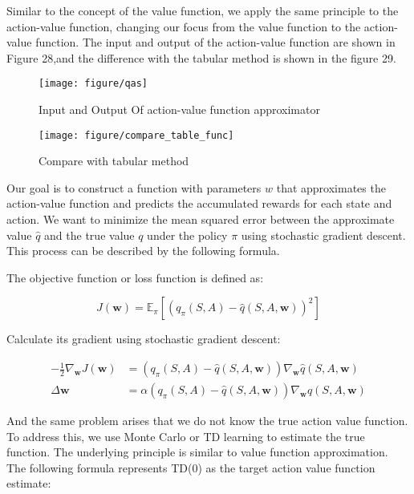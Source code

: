 \documentclass{article}
\begin{document}
Similar to the concept of the value function, we apply the same principle to the action-value function, changing our focus from the value function to the action-value function. The input and output of the action-value function are shown in Figure 28,and the difference with the tabular method is shown in the figure 29.

\begin{figure}[htbp]
        \centering
        \texttt{[image: figure/qas]}
        \caption{Input and Output Of action-value function approximator}
\end{figure}

\begin{figure}[htbp]
        \centering
        \texttt{[image: figure/compare\_table\_func]}
        \caption{Compare with tabular method}
\end{figure}


Our goal is to construct a function with parameters $w$ that approximates the action-value function and predicts the accumulated rewards for each state and action. We want to minimize the mean squared error between the approximate value $\hat{q}$ and the true value $q$ under the policy $\pi$ using stochastic gradient descent. This process can be described by the following formula.

The objective function or loss function is defined as:


\begin{equation}
J(\mathbf{w})=\mathbb{E}_\pi\left[\left(q_\pi(S, A)-\hat{q}(S, A, \mathbf{w})\right)^2\right]
\end{equation}

Calculate its gradient using stochastic gradient descent:

\begin{equation}
\begin{aligned}-\frac{1}{2} \nabla_{\mathbf{w}} J(\mathbf{w}) & =\left(q_\pi(S, A)-\hat{q}(S, A, \mathbf{w})\right) \nabla_{\mathbf{w}} \hat{q}(S, A, \mathbf{w}) \\ \Delta \mathbf{w} & =\alpha\left(q_\pi(S, A)-\hat{q}(S, A, \mathbf{w})\right) \nabla_{\mathbf{w}} \hat{q}(S, A, \mathbf{w})\end{aligned}
\end{equation}

And the same problem arises that we do not know the true action value function. To address this, we use Monte Carlo or TD learning to estimate the true function. The underlying principle is similar to value function approximation. The following formula represents TD(0) as the target action value function estimate:
\end{document}
